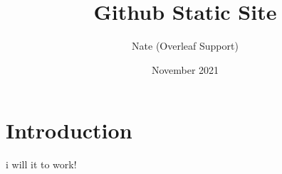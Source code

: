 \documentclass{article}
\title{Github Static Site}
\author{Nate (Overleaf Support)}
\date{November 2021}
\begin{document}
\maketitle

\section{Introduction}

i will it to work!
\end{document}
